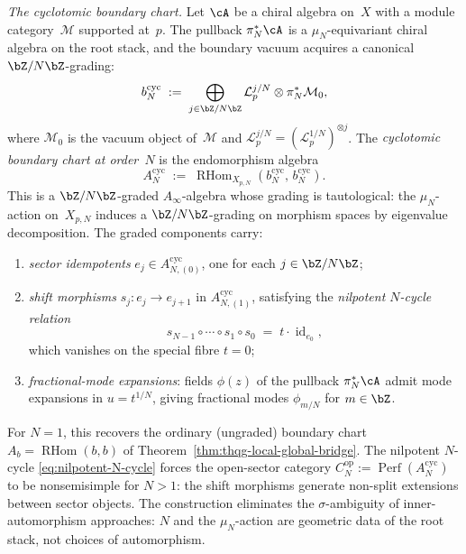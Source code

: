 \emph{The cyclotomic boundary chart.}%
\ClaimStatusConjectured{}
Let $\cA$ be a chiral algebra on~$X$ with a module
category~$\mathcal{M}$ supported at~$p$.
The pullback $\pi_N^* \cA$ is a
$\mu_N$-equivariant chiral algebra on the root stack,
and the boundary vacuum acquires a canonical
$\bZ/N\bZ$-grading:
\begin{equation}\label{eq:cyclotomic-vacuum}
b^{\mathrm{cyc}}_{N}
\;:=\;
\bigoplus_{j \in \bZ/N\bZ}
\mathcal{L}_p^{j/N} \otimes \pi_N^* \mathcal{M}_0,
\end{equation}
where $\mathcal{M}_0$ is the vacuum object of~$\mathcal{M}$
and $\mathcal{L}_p^{j/N} = (\mathcal{L}_p^{1/N})^{\otimes j}$.
The \emph{cyclotomic boundary chart at order~$N$} is the
endomorphism algebra
\begin{equation}\label{eq:cyclotomic-chart}
A^{\mathrm{cyc}}_N
\;:=\;
\operatorname{RHom}_{X_{p,N}}(b^{\mathrm{cyc}}_N,\,
b^{\mathrm{cyc}}_N).
\end{equation}
This is a $\bZ/N\bZ$-graded $A_\infty$-algebra
whose grading is tautological: the $\mu_N$-action
on~$X_{p,N}$ induces a $\bZ/N\bZ$-grading on
morphism spaces by eigenvalue decomposition.
The graded components carry:
\begin{enumerate}[label=\textup{(\alph*)},nosep]
\item \emph{sector idempotents}
$e_j \in A^{\mathrm{cyc}}_{N,(0)}$, one for
each $j \in \bZ/N\bZ$;
\item \emph{shift morphisms}
$s_j \colon e_j \to e_{j+1}$ in $A^{\mathrm{cyc}}_{N,(1)}$,
satisfying the \emph{nilpotent $N$-cycle relation}
\begin{equation}\label{eq:nilpotent-N-cycle}
s_{N-1} \circ \cdots \circ s_1 \circ s_0
\;=\;
t \cdot \operatorname{id}_{e_0},
\end{equation}
which vanishes on the special fibre $t = 0$;
\item \emph{fractional-mode expansions}:
fields $\phi(z)$ of the pullback
$\pi_N^* \cA$ admit mode expansions in
$u = t^{1/N}$, giving fractional modes
$\phi_{m/N}$ for $m \in \bZ$.
\end{enumerate}
For $N = 1$, this recovers the ordinary (ungraded)
boundary chart
$A_b = \operatorname{RHom}(b, b)$
of Theorem~\ref{thm:thqg-local-global-bridge}.
The nilpotent $N$-cycle \eqref{eq:nilpotent-N-cycle}
forces the open-sector category
$C^{\mathrm{op}}_N := \operatorname{Perf}(A^{\mathrm{cyc}}_N)$
to be nonsemisimple for $N > 1$: the shift morphisms
generate non-split extensions between sector objects.
The construction eliminates the $\sigma$-ambiguity of
inner-automorphism approaches: $N$ and the
$\mu_N$-action are geometric data of the root stack,
not choices of automorphism.

